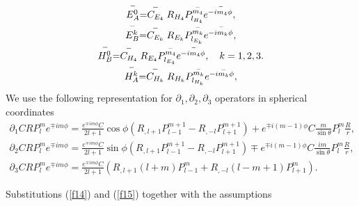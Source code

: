 \documentclass[a4paper,12pt]{article}
\begin{document}
\begin{equation}  \label{f14}
\begin{array}{c}
\stackrel{-}{E_A^0}=\stackrel{-}{C_{E_4}}R_{H_4}P_{l_{H_4}}^{\stackrel{-}{%
m_4 }}e^{-\stackrel{-}{im_4}\phi }, \\
\stackrel{-}{E_B^k}=\stackrel{-}{C_{E_k}} R_{E_k}P_{l_{E_k}}^{\stackrel{-}{%
m_k}}e^{-\stackrel{-}{im_k}\phi }, \\
\stackrel{-}{H_B^0}=\stackrel{-}{C_{H_4}}R_{E_4}P_{l_{E_4}}^{\stackrel{-}{%
m_4 }}e^{-\stackrel{-}{im_4}\phi }, \quad k=1,2,3. \\
\stackrel{-}{H_A^k}= \stackrel{-}{C_{H_k}}R_{H_k}P_{l_{H_k}}^{\stackrel{-}{%
m_k}}e^{-i\stackrel{-}{ m_k}\phi },
\end{array}
\end{equation}
We use the following representation for $\partial _1,\partial _2,\partial _3$
operators in spherical coordinates
\begin{equation}  \label{f15}
\begin{array}{c}
\partial _1CRP_l^me^{\mp im\phi }= \frac{e^{\mp im\phi }C}{2l+1}\cos \phi
\left( R_{,l+1}P_{l-1}^{m+1}-R_{,-l}P_{l+1}^{m+1}\right) +e^{\mp i(m-1)\phi
}C\frac m{\sin \theta }P_l^m\frac Rr, \\
\partial _2CRP_l^me^{\mp im\phi }= \frac{e^{\mp im\phi }C}{2l+1}\sin \phi
\left( R_{,l+1}P_{l-1}^{m+1}-R_{,-l}P_{l+1}^{m+1}\right) \mp e^{\mp
i(m-1)\phi }C \frac{im}{\sin \theta }P_l^m\frac Rr, \\
\partial _3CRP_l^me^{\mp im\phi }= \frac{e^{\mp im\phi }C}{2l+1}\left(
R_{,l+1}(l+m)P_{l-1}^m+R_{,-l}(l-m+1)P_{l+1}^m\right) .
\end{array}
\end{equation}

Substitutions (\ref{f14}) and (\ref{f15}) together with the assumptions
\end{document}
